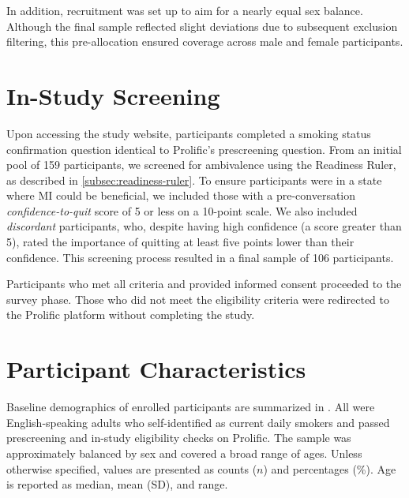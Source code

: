 In addition, recruitment was set up to aim for a nearly equal sex balance. Although the final sample reflected slight deviations due to subsequent exclusion filtering, this pre-allocation ensured coverage across male and female participants.

\section{In-Study Screening}
Upon accessing the study website, participants completed a smoking status confirmation question identical to Prolific's prescreening question. From an initial pool of 159 participants, we screened for ambivalence using the Readiness Ruler, as described in \cref{subsec:readiness-ruler}. To ensure participants were in a state where MI could be beneficial, we included those with a pre-conversation \emph{confidence-to-quit} score of 5 or less on a 10-point scale. We also included \emph{discordant}
participants, who, despite having high confidence (a score greater than 5), rated the importance of quitting at least five points lower than their confidence. This screening process resulted in a final sample of 106 participants.

Participants who met all criteria and provided informed consent proceeded to the survey phase. Those who did not meet the eligibility criteria were redirected to the Prolific platform without completing the study.

\section{Participant Characteristics}
\label{subsec:participant-characteristics}
\noindent Baseline demographics of enrolled participants are summarized in . All were English-speaking adults who self-identified as current daily smokers and passed prescreening and in-study eligibility checks on Prolific. The sample was approximately balanced by sex and covered a broad range of ages. Unless otherwise specified, values are presented as counts ($n$) and percentages (\%). Age is reported as median, mean (SD), and range.

